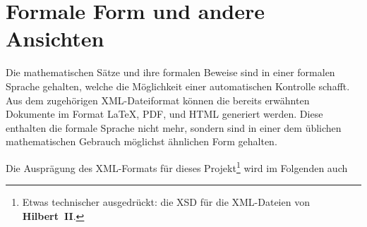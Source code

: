 \documentclass[a4paper,german,10pt,twoside]{book}
\begin{document}
\section{Formale Form und andere Ansichten}
Die mathematischen S{\"a}tze und ihre formalen Beweise sind in einer formalen Sprache gehalten, welche
die M{\"o}glichkeit einer automatischen Kontrolle schafft. Aus dem zugeh{\"o}rigen XML-Dateiformat k{\"o}nnen
die bereits erw{\"a}hnten Dokumente im Format \LaTeX{}, PDF, und HTML generiert werden. Diese enthalten
die formale Sprache nicht mehr, sondern sind in einer dem {\"u}blichen mathematischen Gebrauch
m{\"o}glichst {\"a}hnlichen Form gehalten.
\par
Die Auspr{\"a}gung des XML-Formats f{\"u}r dieses Projekt\footnote{Etwas technischer ausgedr{\"u}ckt: die XSD
f{\"u}r die XML-Dateien von \textbf{Hilbert~II}.} wird im Folgenden auch
\end{document}
